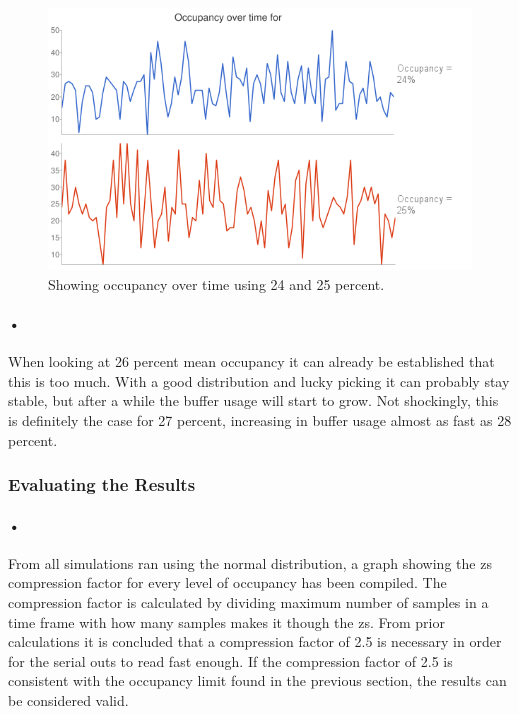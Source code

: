 \documentclass[a4paper, 12pt]{report}
\begin{document}
\begin{figure}[h!]
	\centering
		\includegraphics[width=1.0\textwidth]{images/occ-over-time.png}
		\caption{Showing occupancy over time using 24 and 25 percent.}
		\label{fig:occ-over-time}
\end{figure}

\paragraph{•}
When looking at 26 percent mean occupancy it can already be established that this is too much.
With a good distribution and lucky picking it can probably stay stable, but after a while the buffer usage will start to grow.
Not shockingly, this is definitely the case for 27 percent, increasing in buffer usage almost as fast as 28 percent.

\subsubsection{Evaluating the Results}

\paragraph{•}
From all simulations ran using the normal distribution, a graph showing the \gls{zs} compression factor for every level of occupancy has been compiled.
The compression factor is calculated by dividing maximum number of samples in a time frame with how many samples makes it though the \gls{zs}.
From prior calculations it is concluded that a compression factor of 2.5 is necessary in order for the serial outs to read fast enough.
If the compression factor of 2.5 is consistent with the occupancy limit found in the previous section, the results can be considered valid.
\end{document}
